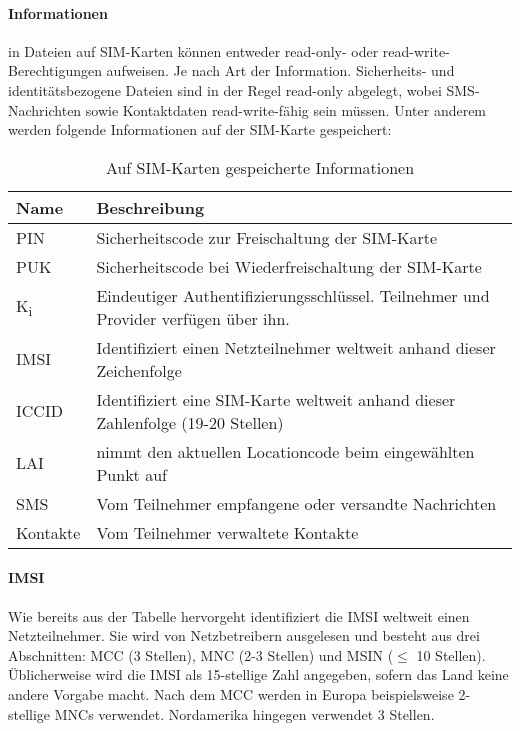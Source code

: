 \paragraph{Informationen} in Dateien auf SIM-Karten können entweder read-only- oder read-write-
Berechtigungen aufweisen. Je nach Art der Information. Sicherheits- und identitätsbezogene
Dateien sind in der Regel read-only abgelegt, wobei SMS-Nachrichten sowie Kontaktdaten
read-write-fähig sein müssen. Unter anderem werden folgende Informationen auf der SIM-Karte gespeichert:

\begin{table}[h]
    \begin{tabularx}{\textwidth}{|l|X|}
    \hline
      \textbf{Name} & \textbf{Beschreibung} \\
    \hline
    \hline
      \ac{PIN} & Sicherheitscode zur Freischaltung der SIM-Karte \\
    \hline
    \hline
          \ac{PUK} & Sicherheitscode bei Wiederfreischaltung der SIM-Karte \\
    \hline
    \hline
      K\textsubscript{i} & Eindeutiger Authentifizierungsschlüssel. Teilnehmer und Provider verfügen über ihn. \\
    \hline
    \hline
      \ac{IMSI} & Identifiziert einen Netzteilnehmer weltweit anhand dieser Zeichenfolge \\
    \hline
    \hline
      \ac{ICCID} & Identifiziert eine SIM-Karte weltweit anhand dieser Zahlenfolge (19-20 Stellen) \\
    \hline
    \hline
      \ac{LAI} & nimmt den aktuellen Locationcode beim eingewählten Punkt auf \\ 
    \hline
    \hline
      SMS & Vom Teilnehmer empfangene oder versandte Nachrichten \\
    \hline
    \hline
      Kontakte & Vom Teilnehmer verwaltete Kontakte \\
    \hline
    \end{tabularx}
    \caption{Auf SIM-Karten gespeicherte Informationen}
  \end{table}

\paragraph{IMSI} Wie bereits aus der Tabelle hervorgeht identifiziert die \ac{IMSI} weltweit
einen Netzteilnehmer. Sie wird von Netzbetreibern ausgelesen und besteht aus drei Abschnitten:
\ac{MCC} (3 Stellen), \ac{MNC} (2-3 Stellen) und \ac{MSIN} ($\leq$ 10 Stellen).
Üblicherweise wird die \ac{IMSI} als 15-stellige Zahl angegeben, sofern das
Land keine andere Vorgabe macht. Nach dem \ac{MCC} werden in Europa beispielsweise 2-stellige \acp{MNC}
verwendet. Nordamerika hingegen verwendet 3 Stellen. 

